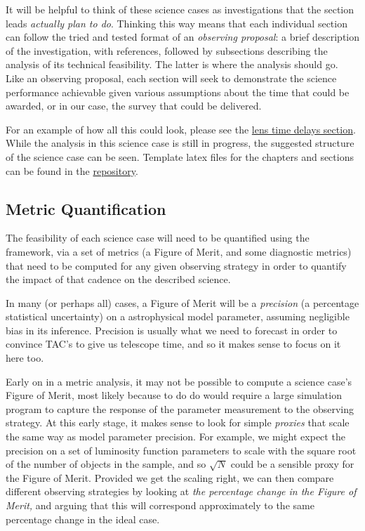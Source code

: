 It will be helpful to think of these science
cases as investigations that the section leads {\it actually plan to
do}. Thinking this way means that each individual section can follow the
tried and tested format of an {\it observing proposal}: a brief
description of the investigation, with references, followed by subsections
describing the analysis
of its technical feasibility. The latter is where the \MAF analysis
should go. Like an observing proposal, each section will seek to
demonstrate the science performance achievable given various assumptions
about the time that could be awarded, or in our case, the survey that
could be delivered.

For an example of how all this could look, please see the
\hyperref[sec:lenstimedelays]{lens time delays section}. While the \MAF
analysis in this science case is still in progress, the suggested
structure of the science case can be seen. Template latex files for the
chapters and sections can be found in the
\href{https://github.com/LSSTScienceCollaborations/ObservingStrategy}{\GitHub
repository}.


\subsection{Metric Quantification}
\label{sec:\secname:metrics}

The feasibility of each science case will need to be quantified using
the \MAF framework, via a set of metrics (a Figure of Merit, and some
diagnostic metrics)  that need to be computed for any given observing
strategy in order to quantify the impact of that cadence on the
described science.

In many (or perhaps all) cases, a Figure of Merit will be a
\textit{precision} (\ie a percentage statistical uncertainty) on a
astrophysical model parameter, assuming negligible bias in its
inference. Precision is usually what we need to forecast in order to
convince TAC's to give us telescope time, and so it makes sense to focus
on it here too.

Early on in a metric analysis, it may not be possible to compute a
science case's Figure of Merit, most likely because to do do would
require a large simulation program to capture the response of the
parameter measurement to the observing strategy. At this early stage, it
makes sense to look for simple {\it proxies} that scale the same way as
model parameter precision. For example, we might expect the precision on
a set of luminosity function  parameters to scale with the square root
of the number of objects in the sample, and so $\sqrt{N}$ could be a
sensible proxy for the Figure of Merit. Provided we get the scaling
right, we can then compare different observing strategies by looking  at
{\it the percentage change in the Figure of Merit,} and arguing that
this will correspond approximately to the same percentage change in the
ideal case.

